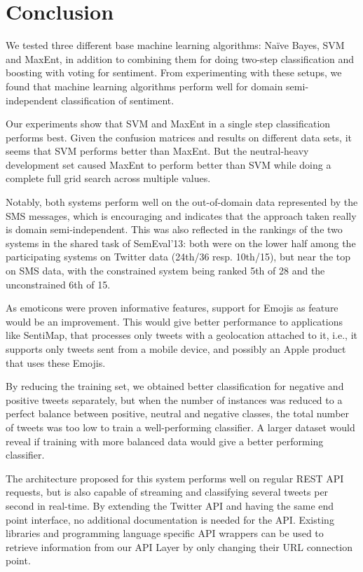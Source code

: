 \chapter{Conclusion}
We tested three different base machine learning algorithms: Na\"{i}ve Bayes, SVM and MaxEnt, in addition to combining them for doing two-step classification and boosting with voting for sentiment. From experimenting with these setups, we found that machine learning algorithms perform well for domain semi-independent classification of sentiment.

Our experiments show that SVM and MaxEnt in a single step classification performs best. Given the confusion matrices and results on different data sets, it seems that SVM performs better than MaxEnt. But the neutral-heavy development set caused MaxEnt to perform better than SVM while doing a complete full grid search across multiple values.

Notably, both systems perform well on the out-of-domain data represented by the SMS messages, which is encouraging and indicates that the approach taken really is domain semi-independent. This was also reflected in the rankings of the two systems in the shared task of SemEval'13: both were on the lower half among the participating systems on Twitter data (24th/36 resp. 10th/15), but near the top on SMS data, with the constrained system being ranked 5th of 28  and the unconstrained 6th of 15.

As emoticons were proven informative features, support for Emojis as feature would be an improvement. This would give better performance to applications like SentiMap, that processes only tweets with a geolocation attached to it, i.e., it supports only tweets sent from a mobile device, and possibly an Apple product that uses these Emojis.

By reducing the training set, we obtained better classification for negative and positive tweets separately, but when the number of instances was reduced to a perfect balance between positive, neutral and negative classes, the total number of tweets was too low to train a well-performing classifier. A larger dataset would reveal if training with more balanced data would give a better performing classifier.

The architecture proposed for this system performs well on regular REST API requests, but is also capable of streaming and classifying several tweets per second in real-time. By extending the Twitter API and having the same end point interface, no additional documentation is needed for the API. Existing libraries and programming language specific API wrappers can be used to retrieve information from our API Layer by only changing their URL connection point. 

